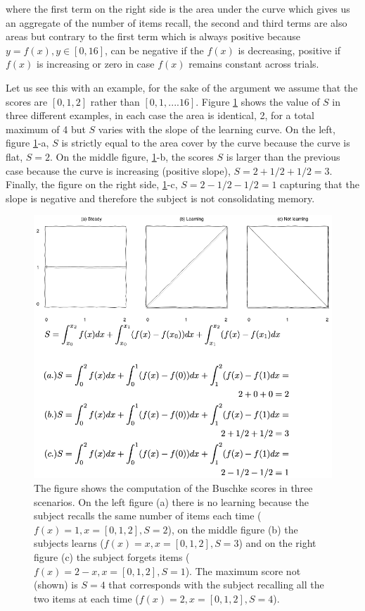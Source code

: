\documentclass[11pt]{article}
\theoremstyle{definition}
\theoremstyle{remark}
\begin{document}
where the first term on the right side is the area under the curve which gives us an aggregate of the number of items recall, the second and third terms are also areas but contrary to the first term which is always positive because $y =f(x), y \in [0,16]$, can be negative if the $f(x)$ is decreasing, positive if $f(x)$ is increasing or zero in case $f(x)$ remains constant across trials.

Let us see this with an example, for the sake of the argument we assume that the scores are $[0,1,2]$ rather than $[0,1,....16]$. Figure \ref{fig:b} shows the value of $S$ in three different examples, in each case the area is identical, 2, for a total maximum of 4 but $S$ varies with the slope of the learning curve. On the left, figure \ref{fig:b}-a,
$S$ is strictly equal to the area cover by the curve because the curve is flat, $S=2$. On the middle figure, \ref{fig:b}-b, the scores $S$ is larger than the previous case because the curve is increasing (positive slope), $S=2+1/2+1/2=3$. Finally, the figure on the right side, \ref{fig:b}-c, $S=2-1/2-1/2=1$ capturing that the slope is negative and therefore the subject is not consolidating memory.      
  
\begin{figure}[H]
        \centering
        \includegraphics[keepaspectratio, width=\linewidth]{figures/fig_buschkewitheqs}
        \caption{The figure shows the computation of the Buschke scores in three scenarios. On the left figure (a) there is no learning because the subject recalls the same number of items each time ($f(x)=1, x=[0,1,2], S=2$), on the middle figure (b) the subjects learns ($f(x)=x, x=[0,1,2], S=3$) and on the right figure (c) the subject forgets items ($f(x)=2-x, x=[0,1,2], S=1$). The maximum score not (shown) is $S=4$ that corresponds with the subject recalling all the two items at each time ($f(x)=2, x=[0,1,2], S=4$).} 
        \label{fig:b}
\end{figure}
\end{document}

